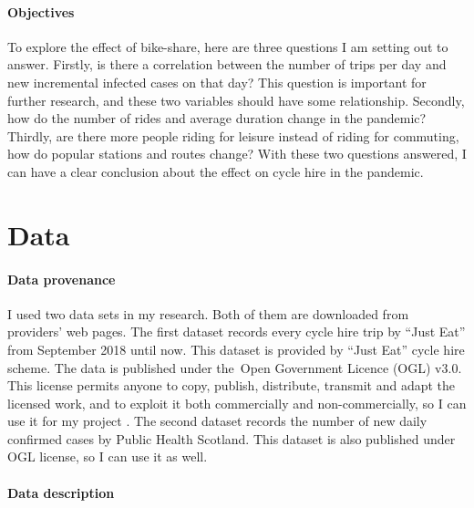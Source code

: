 \documentclass[11pt,a4paper]{article}
\begin{document}

\paragraph{Objectives}


To explore the effect of bike-share, here are three questions I am setting out to answer. Firstly, is there a correlation between the number of trips per day and new incremental infected cases on that day? This question is important for further research, and these two variables should have some relationship. Secondly, how do the number of rides and average duration change in the pandemic? Thirdly, are there more people riding for leisure instead of riding for commuting, how do popular stations and routes change? With these two questions answered, I can have a clear conclusion about the effect on cycle hire in the pandemic.

\section{Data}

\paragraph{Data provenance} %

I used two data sets in my research. Both of them are downloaded from providers’ web pages. The first dataset records every cycle hire trip by “Just Eat” from September 2018 until now. This dataset is provided by “Just Eat” cycle hire scheme. The data is published under the Open Government Licence (OGL) v3.0. This license permits anyone to copy, publish, distribute, transmit and adapt the licensed work, and to exploit it both commercially and non-commercially, so I can use it for my project \cite{OGL}. The second dataset records the number of new daily confirmed cases by Public Health Scotland. This dataset is also published under OGL license, so I can use it as well.

\paragraph{Data description} %
\end{document}
